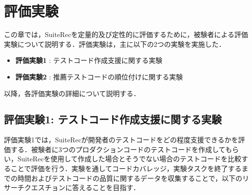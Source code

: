 \documentclass[12pt]{jarticle} %
\begin{document}
\newpage
\section{評価実験}

この章では，{\sf SuiteRec}を定量的及び定性的に評価するために，被験者による評価実験について説明する．評価実験は，主に以下の2つの実験を実施した．

\begin{itemize}
\item \textbf{評価実験1} : テストコード作成支援に関する実験
\item \textbf{評価実験2} : 推薦テストコードの順位付けに関する実験
\end{itemize}

以降，各評価実験の詳細について説明する．

\subsection{評価実験1: テストコード作成支援に関する実験}
評価実験1では，{\sf SuiteRec}が開発者のテストコードをどの程度支援できるかを評価する．被験者に3つのプロダクションコードのテストコードを作成してもらい，{\sf SuiteRec}を使用して作成した場合とそうでない場合のテストコードを比較することで評価を行う．実験を通してコードカバレッジ，実験タスクを終了するまでの時間およびテストコードの品質に関するデータを収集することで，以下のリサーチクエスチョンに答えることを目指す．
\end{document}
